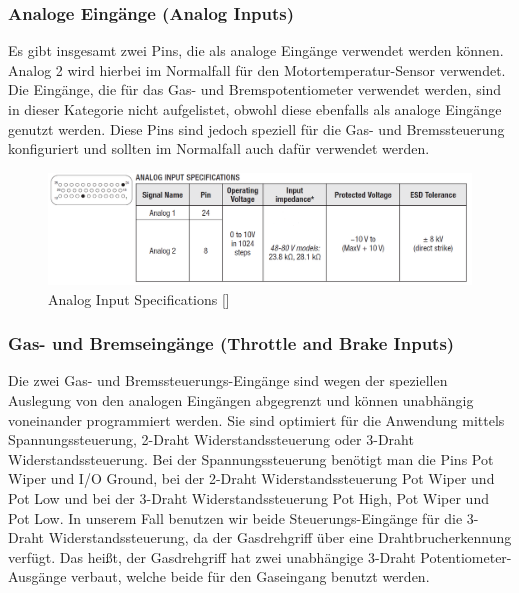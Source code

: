 \subsubsection{Analoge Eingänge (Analog Inputs)}
\label{Analoge_Eingaenge}
Es gibt insgesamt zwei Pins, die als analoge Eingänge verwendet werden können. Analog 2 wird hierbei im Normalfall für den Motortemperatur-Sensor verwendet. Die Eingänge, die für das Gas- und Bremspotentiometer verwendet werden, sind in dieser Kategorie nicht aufgelistet, obwohl diese ebenfalls als analoge Eingänge genutzt werden. Diese Pins sind jedoch speziell für die Gas- und Bremssteuerung konfiguriert und sollten im Normalfall auch dafür verwendet werden.

\begin{figure}[H]
	\begin{center}
		\includegraphics[width=\textwidth]{figures/antrieb/Analog_Input_Specifications.png}
		\caption{Analog Input Specifications [\cite{Manual}]}
	\end{center}
\end{figure}



\newpage



\subsubsection{Gas- und Bremseingänge (Throttle and Brake Inputs)}
\label{Gas-Brems_Eingaenge}
Die zwei Gas- und Bremssteuerungs-Eingänge sind wegen der speziellen Auslegung von den analogen Eingängen abgegrenzt und können unabhängig voneinander programmiert werden. Sie sind optimiert für die Anwendung mittels Spannungssteuerung, 2-Draht Widerstandssteuerung oder 3-Draht Widerstandssteuerung. Bei der Spannungssteuerung benötigt man die Pins Pot Wiper und I/O Ground, bei der 2-Draht Widerstandssteuerung Pot Wiper und Pot Low und bei der 3-Draht Widerstandssteuerung Pot High, Pot Wiper und Pot Low. In unserem Fall benutzen wir beide Steuerungs-Eingänge für die 3-Draht Widerstandssteuerung, da der Gasdrehgriff über eine Drahtbrucherkennung verfügt. Das heißt, der Gasdrehgriff hat zwei unabhängige 3-Draht Potentiometer-Ausgänge verbaut, welche beide für den Gaseingang benutzt werden.

